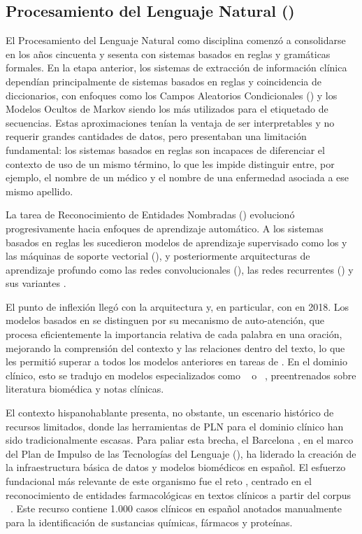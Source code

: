 \subsection{Procesamiento del Lenguaje Natural ()}
El Procesamiento del Lenguaje Natural como disciplina comenzó a consolidarse en los años cincuenta y sesenta
con sistemas basados en reglas y gramáticas formales. En la etapa anterior, los sistemas de extracción
de información clínica dependían principalmente de sistemas basados en reglas y coincidencia de diccionarios, con enfoques
como los Campos Aleatorios Condicionales () y los Modelos Ocultos de Markov siendo los más utilizados para el
etiquetado de secuencias. Estas aproximaciones tenían la ventaja de ser interpretables y no requerir grandes cantidades de datos, 
pero presentaban una limitación fundamental: los sistemas basados en reglas son incapaces de diferenciar
el contexto de uso de un mismo término, lo que les impide distinguir entre, por ejemplo, el nombre de un médico y
el nombre de una enfermedad asociada a ese mismo apellido. 

La tarea de Reconocimiento de Entidades Nombradas () evolucionó progresivamente hacia enfoques de aprendizaje 
automático. A los sistemas basados en reglas les sucedieron modelos de aprendizaje supervisado como los  y las 
máquinas de soporte vectorial (), y posteriormente arquitecturas de aprendizaje profundo como las redes 
convolucionales (), las redes recurrentes () y sus variantes .

El punto de inflexión llegó con la arquitectura  y, en particular, con  en 2018. 
Los modelos basados en  se distinguen por su mecanismo de auto-atención, que procesa eficientemente la 
importancia relativa de cada palabra en una oración, mejorando la comprensión del contexto y las relaciones 
dentro del texto, lo que les permitió superar a todos los modelos anteriores en tareas de . En el dominio 
clínico, esto se tradujo en modelos especializados como ~ o
~, preentrenados sobre literatura
biomédica y notas clínicas.

El contexto hispanohablante presenta, no obstante, un escenario histórico de recursos limitados, donde las herramientas
de PLN para el dominio clínico han sido tradicionalmente escasas. Para paliar esta brecha, el Barcelona , 
en el marco del Plan de Impulso de las Tecnologías del Lenguaje (), ha liderado la creación de la
infraestructura básica de datos y modelos biomédicos en español. El esfuerzo fundacional más relevante de este
organismo fue el reto , centrado en el reconocimiento de entidades farmacológicas en textos
clínicos a partir del corpus ~.
Este recurso contiene 1.000 casos
clínicos en español anotados manualmente para la identificación de sustancias químicas, fármacos y proteínas.

